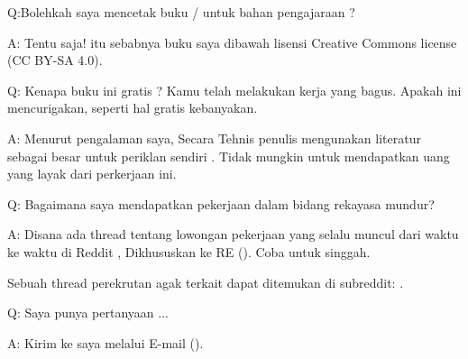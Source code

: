 \par Q:Bolehkah saya mencetak buku / untuk bahan pengajaraan ?
\par A: Tentu saja! itu sebabnya buku saya dibawah lisensi Creative Commons license (CC BY-SA 4.0).

\par Q: Kenapa buku ini gratis ? Kamu telah melakukan kerja yang bagus. Apakah ini mencurigakan, seperti hal gratis kebanyakan.
\par A: Menurut pengalaman saya, Secara Tehnis penulis mengunakan literatur sebagai besar untuk periklan sendiri . Tidak mungkin untuk mendapatkan uang yang layak dari perkerjaan ini.

\par Q: Bagaimana saya mendapatkan pekerjaan dalam bidang rekayasa mundur?
\par A: Disana ada thread tentang lowongan pekerjaan yang selalu muncul dari waktu ke waktu di Reddit , Dikhususkan ke RE\FNURLREDDIT{}
(\RedditHiringThread{}).
Coba untuk singgah.

Sebuah thread perekrutan agak terkait dapat ditemukan di  subreddit: \NetsecHiringThread{}.


\par Q: Saya punya pertanyaan ...
\par A: Kirim ke saya melalui E-mail (\EMAIL).

